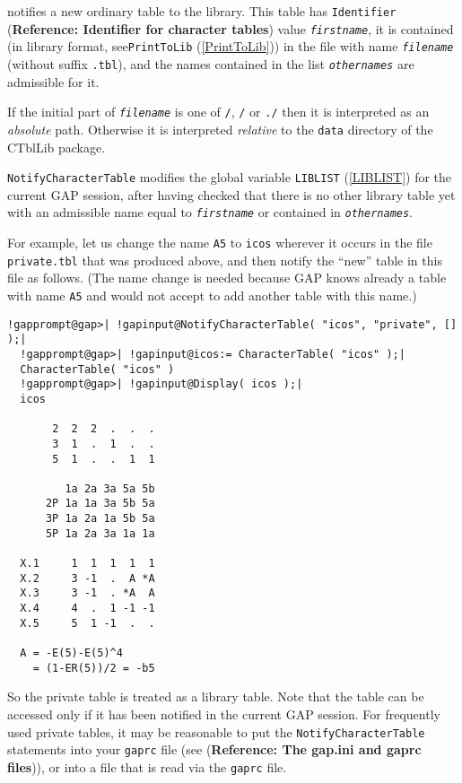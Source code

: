 \documentclass[a4paper,11pt]{report}
\begin{document}
{{{ notifies a new ordinary table to the library. This table has \texttt{Identifier} (\textbf{Reference: Identifier for character tables}) value \mbox{\texttt{\mdseries\slshape firstname}}, it is contained (in library format, see{\nobreakspace}\texttt{PrintToLib} (\ref{PrintToLib})) in the file with name \mbox{\texttt{\mdseries\slshape filename}} (without suffix \texttt{.tbl}), and the names contained in the list \mbox{\texttt{\mdseries\slshape othernames}} are admissible for it. 

 If the initial part of \mbox{\texttt{\mdseries\slshape filename}} is one of \texttt{\texttt{}/}, \texttt{/} or \texttt{./} then it is interpreted as an \emph{absolute} path. Otherwise it is interpreted \emph{relative} to the \texttt{data} directory of the \textsf{CTblLib} package. 

 \texttt{NotifyCharacterTable} modifies the global variable \texttt{LIBLIST} (\ref{LIBLIST}) for the current \textsf{GAP} session, after having checked that there is no other library table yet with an
admissible name equal to \mbox{\texttt{\mdseries\slshape firstname}} or contained in \mbox{\texttt{\mdseries\slshape othernames}}. 

 For example, let us change the name \texttt{A5} to \texttt{icos} wherever it occurs in the file \texttt{private.tbl} that was produced above, and then notify the ``new'' table in this file as follows. (The name change is needed because \textsf{GAP} knows already a table with name \texttt{A5} and would not accept to add another table with this name.) 

 
\begin{Verbatim}[commandchars=!@|,fontsize=\small,frame=single,label=Example]
  !gapprompt@gap>| !gapinput@NotifyCharacterTable( "icos", "private", [] );|
  !gapprompt@gap>| !gapinput@icos:= CharacterTable( "icos" );|
  CharacterTable( "icos" )
  !gapprompt@gap>| !gapinput@Display( icos );|
  icos
  
       2  2  2  .  .  .
       3  1  .  1  .  .
       5  1  .  .  1  1
  
         1a 2a 3a 5a 5b
      2P 1a 1a 3a 5b 5a
      3P 1a 2a 1a 5b 5a
      5P 1a 2a 3a 1a 1a
  
  X.1     1  1  1  1  1
  X.2     3 -1  .  A *A
  X.3     3 -1  . *A  A
  X.4     4  .  1 -1 -1
  X.5     5  1 -1  .  .
  
  A = -E(5)-E(5)^4
    = (1-ER(5))/2 = -b5
\end{Verbatim}
 

 So the private table is treated as a library table. Note that the table can be
accessed only if it has been notified in the current \textsf{GAP} session. For frequently used private tables, it may be reasonable to put the \texttt{NotifyCharacterTable} statements into your \texttt{gaprc} file (see{\nobreakspace} (\textbf{Reference: The gap.ini and gaprc files})), or into a file that is read via the \texttt{gaprc} file. }

}}
\end{document}
